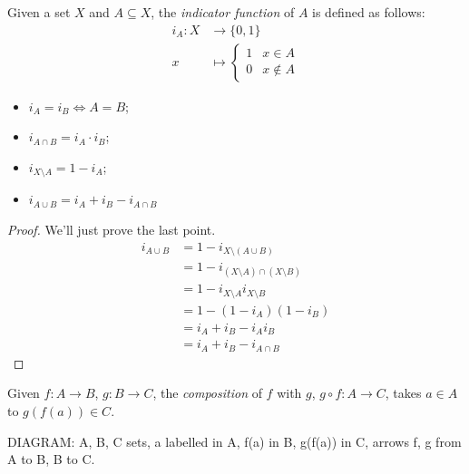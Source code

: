 \documentclass{../template/note}
\begin{document}
    \begin{definition}
        Given a set \(X\) and \(A \subseteq X\), the \emph{indicator function} of \(A\) is defined as follows:
        \begin{align*}
            i_A: X &\to \{0, 1\} \\
            x &\mapsto \begin{cases}
                1 & x \in A \\
                0 & x \notin A
            \end{cases}
        \end{align*}
    \end{definition}
    
    \begin{proposition}
        \begin{itemize}
            \item \(i_A = i_B \iff A = B\);
            \item \(i_{A \cap B} = i_A \cdot i_B\);
            \item \(i_{X \setminus A} = 1 - i_A\);
            \item \(i_{A \cup B} = i_A + i_B - i_{A \cap B}\)
        \end{itemize}
    \end{proposition}
    
    \begin{proof}
        We'll just prove the last point.
        \begin{align*}
            i_{A \cup B} &= 1 - i_{X \setminus (A \cup B)} \\
            &= 1 - i_{(X \setminus A) \cap (X \setminus B)} \\
            &= 1 - i_{X \setminus A} i_{X \setminus B} \\
            &= 1 - (1 - i_A)(1 - i_B) \\
            &= i_A + i_B - i_Ai_B \\
            &= i_A + i_B - i_{A \cap B}
        \end{align*}
        
        
    \end{proof}
    

    \begin{definition}
        Given \(f: A \to B\), \(g: B \to C\), the \emph{composition} of \(f\) with \(g\), \(g \circ f: A \to C\), takes \(a \in A\) to \(g(f(a)) \in C\).

        DIAGRAM: A, B, C sets, a labelled in A, f(a) in B, g(f(a)) in C, arrows f, g from A to B, B to C.
    \end{definition}
    
\end{document}
